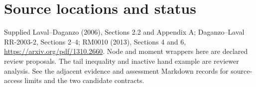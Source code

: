 \documentclass[11pt,a4paper]{article}
\begin{document}
\section*{Source locations and status}
Supplied Laval--Daganzo (2006), Sections 2.2 and Appendix A; Daganzo--Laval
RR-2003-2, Sections 2--4; RM0010 (2013), Sections 4 and 6,
\url{https://arxiv.org/pdf/1310.2660}. Node and moment wrappers here are declared
review proposals. The tail inequality and inactive hand example are reviewer
analysis. See the adjacent evidence and assessment Markdown records for
source-access limits and the two candidate contracts.
\end{document}
